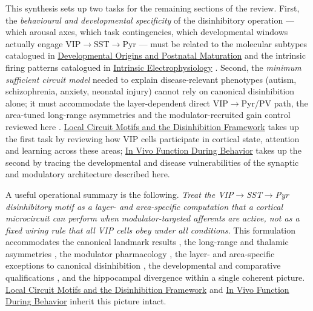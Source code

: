 \documentclass[11pt]{article}
\let\origrightarrow\rightarrow
\def\rightarrow{\ensuremath{\origrightarrow}}
\begin{document}
This synthesis sets up two tasks for the remaining sections of the review. First, the \textit{behavioural and developmental specificity} of the disinhibitory operation --- which arousal axes, which task contingencies, which developmental windows actually engage VIP\rightarrow SST\rightarrow Pyr --- must be related to the molecular subtypes catalogued in \href{/development}{Developmental Origins and Postnatal Maturation} and the intrinsic firing patterns catalogued in \href{/electrophysiology}{Intrinsic Electrophysiology} \citep{Tasic2018, Pronneke2019, Pronneke2015, Frazer2017, Lee2010, Rudy2011}. Second, the \textit{minimum sufficient circuit model} needed to explain disease-relevant phenotypes (autism, schizophrenia, anxiety, neonatal injury) cannot rely on canonical disinhibition alone; it must accommodate the layer-dependent direct VIP\rightarrow Pyr/PV path, the area-tuned long-range asymmetries and the modulator-recruited gain control reviewed here \citep{Yu2019, Zhou2017, Anastasiades2021a, Letzkus2011, Sabri2024, Krabbe2019}. \href{/disinhibition-framework}{Local Circuit Motifs and the Disinhibition Framework} takes up the first task by reviewing how VIP cells participate in cortical state, attention and learning across these areas; \href{/in-vivo-behavior}{In Vivo Function During Behavior} takes up the second by tracing the developmental and disease vulnerabilities of the synaptic and modulatory architecture described here.

A useful operational summary is the following. \textit{Treat the VIP\rightarrow SST\rightarrow Pyr disinhibitory motif as a layer- and area-specific computation that a cortical microcircuit can perform when modulator-targeted afferents are active, not as a fixed wiring rule that all VIP cells obey under all conditions}. This formulation accommodates the canonical landmark results \citep{Pfeffer2013, Pi2013, Lee2013, Fu2014, Karnani2016a, Karnani2016b}, the long-range and thalamic asymmetries \citep{Wall2016, Williams2019, Anastasiades2021a, Audette2018, Stachniak2023, Bilash2023, Cruikshank2012}, the modulator pharmacology \citep{Porter1999, Kawaguchi1997b, Arroyo2012, Vonengelhardt2007, Granger2020, Obermayer2019, Letzkus2011, Ferezou2002, Vucurovic2010, Frazer2017}, the layer- and area-specific exceptions to canonical disinhibition \citep{Yu2019, Zhou2017, Anastasiades2021a, Walker2016}, the developmental and comparative qualifications \citep{Favuzzi2019, Batistabrito2017, Qiu2020, Simacek2025a, Vormsteinschneider2020, Defelipe1999}, and the hippocampal divergence \citep{Tyan2014, Turi2019, Francavilla2018a, Booker2018, Bilash2023, Tamboli2024, Toth1993} within a single coherent picture. \href{/disinhibition-framework}{Local Circuit Motifs and the Disinhibition Framework} and \href{/in-vivo-behavior}{In Vivo Function During Behavior} inherit this picture intact.
\end{document}
